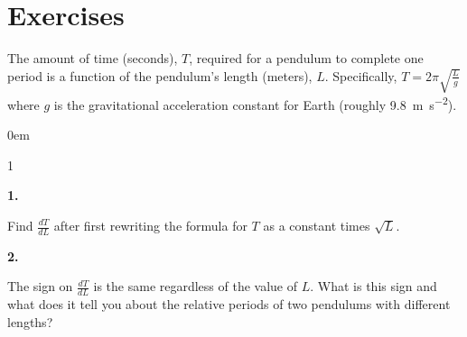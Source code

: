 \documentclass[12pt,]{book}
\theoremstyle{plain}
\theoremstyle{definition}
\numberwithin{equation}{section}
\newenvironment{exercisegroup}%
{\medskip\noindent}%
{\par\bigskip}%
\newlength{\exercisegroupindent}%
\newlength{\exercisegroupitemwidth}%
\newenvironment{exercisegrouplist}%
{\vspace{-\partopsep}%
\begin{adjustwidth}{\exercisegroupindent}{0em}}%
{\end{adjustwidth}%
\vspace{-\partopsep}%
\vspace{\baselineskip}}%
\newenvironment{exercisegroupbycol}[1]%
{\begin{exercisegrouplist}%
\vspace{-\multicolsep}%
\begin{multicols}{#1}%
\setlength{\parindent}{0em}%
\setlength{\exercisegroupitemwidth}{\linewidth}}%
{\end{multicols}%
\vspace{-\multicolsep}%
\end{exercisegrouplist}}%
\newenvironment{exercisegroupitem}[1]%
{\begin{minipage}[t]{\exercisegroupitemwidth}
\vspace{0pt}%
{\bfseries#1}%
\rule{0pt}{\baselineskip}}{\strut%
\end{minipage}%
\hspace{\columnsep}}%
\providecommand\phantomsection{}
\newcommand{\lz}[2]{\frac{d#1}{d#2}}
\begin{document}
\section*{Exercises}\label{exercises-37}

\begin{exercisegroup}%
The amount of time (seconds), \(T\), required for a pendulum to complete one period is a function of the pendulum's length (meters), \(L\).  Specifically, \(T=2\pi\sqrt{\frac{L}{g}}\) where \(g\) is the gravitational acceleration constant for Earth (roughly \SI{9.8}{\meter\per\second\tothe{2}}).%
\begin{exercisegroupbycol}{1}%
\begin{exercisegroupitem}{1. }\phantomsection\hypertarget{exercise-274}{\null}
Find \(\lz{T}{L}\) after first rewriting the formula for \(T\) as a constant times \(\sqrt{L}\).%
\end{exercisegroupitem}%
\par%
\begin{exercisegroupitem}{2. }\phantomsection\hypertarget{exercise-275}{\null}
The sign on \(\lz{T}{L}\) is the same regardless of the value of \(L\).  What is this sign and what does it tell you about the relative periods of two pendulums with different lengths?%
\end{exercisegroupitem}%
\par%
\end{exercisegroupbycol}%
\end{exercisegroup}%
\end{document}
